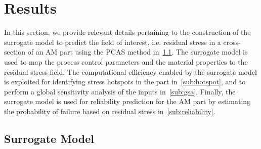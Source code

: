 \section{Results}
\label{sec:results}

In this section, we provide relevant details pertaining to the construction of the surrogate model to predict
the field of interest, i.e. 
residual stress in a cross-section of an  AM part using the PCAS method in~\ref{sub:surr}. The surrogate model is used to map
the process control parameters and the material properties to the residual stress field. The computational efficiency
enabled by the surrogate model is exploited for identifying stress hotspots in the part in~\ref{sub:hotspot}, and
to perform a global sensitivity analysis of the inputs in~\ref{sub:gsa}. Finally, the
surrogate model is used for reliability prediction for the AM part by estimating the probability of failure based on residual stress
in~\ref{sub:reliability}.

\subsection{Surrogate Model}
\label{sub:surr}


